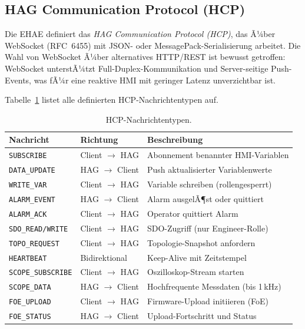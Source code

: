 ﻿\documentclass[12pt,a4paper]{article}
\begin{document}
\subsection{HAG Communication Protocol (HCP)}

Die EHAE definiert das \emph{HAG Communication Protocol (HCP)}, das Ã¼ber WebSocket
(RFC~6455) \cite{rfc6455} mit JSON- oder MessagePack-Serialisierung arbeitet. Die Wahl
von WebSocket Ã¼ber alternatives HTTP/REST ist bewusst getroffen: WebSocket unterstÃ¼tzt
Full-Duplex-Kommunikation und Server-seitige Push-Events, was fÃ¼r eine reaktive HMI mit
geringer Latenz unverzichtbar ist.

Tabelle~\ref{tab:hcp_messages} listet alle definierten HCP-Nachrichtentypen auf.

\begin{table}[H]
\centering
\caption{HCP-Nachrichtentypen.}
\label{tab:hcp_messages}
\begin{tabularx}{\textwidth}{llX}
\toprule
\textbf{Nachricht}          & \textbf{Richtung}     & \textbf{Beschreibung} \\
\midrule
\texttt{SUBSCRIBE}          & Client $\to$ HAG      & Abonnement benannter HMI-Variablen \\
\texttt{DATA\_UPDATE}       & HAG $\to$ Client      & Push aktualisierter Variablenwerte \\
\texttt{WRITE\_VAR}         & Client $\to$ HAG      & Variable schreiben (rollengesperrt) \\
\texttt{ALARM\_EVENT}       & HAG $\to$ Client      & Alarm ausgelÃ¶st oder quittiert \\
\texttt{ALARM\_ACK}         & Client $\to$ HAG      & Operator quittiert Alarm \\
\texttt{SDO\_READ/WRITE}    & Client $\to$ HAG      & SDO-Zugriff (nur Engineer-Rolle) \\
\texttt{TOPO\_REQUEST}      & Client $\to$ HAG      & Topologie-Snapshot anfordern \\
\texttt{HEARTBEAT}          & Bidirektional         & Keep-Alive mit Zeitstempel \\
\texttt{SCOPE\_SUBSCRIBE}   & Client $\to$ HAG      & Oszilloskop-Stream starten \\
\texttt{SCOPE\_DATA}        & HAG $\to$ Client      & Hochfrequente Messdaten (bis 1\,kHz) \\
\texttt{FOE\_UPLOAD}        & Client $\to$ HAG      & Firmware-Upload initiieren (FoE) \\
\texttt{FOE\_STATUS}        & HAG $\to$ Client      & Upload-Fortschritt und Status \\
\bottomrule
\end{tabularx}
\end{table}
\end{document}
